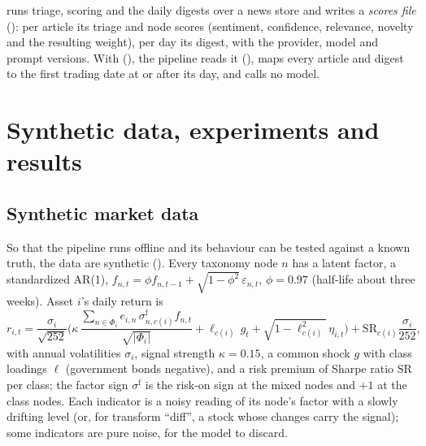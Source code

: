  runs triage, scoring and the daily digests over a news store and writes a
\emph{scores file} (): per article its triage and node scores (sentiment, confidence,
relevance, novelty and the resulting weight), per day its digest, with the provider, model and prompt versions. With
 (), the pipeline reads it (), maps every article and
digest to the first trading date at or after its day, and calls no model.

\chapter{Synthetic data, experiments and results}\label{ch:rb-synthetic}

\section{Synthetic market data}
So that the pipeline runs offline and its behaviour can be tested against a known truth, the data are synthetic
(). Every taxonomy node $n$ has a latent factor, a standardized AR(1),
$f_{n,t}=\phi f_{n,t-1}+\sqrt{1-\phi^2}\,\varepsilon_{n,t}$, $\phi=0.97$ (half-life about three weeks). Asset $i$'s
daily return is
\[
  r_{i,t}=\frac{\sigma_i}{\sqrt{252}}\Big(\kappa\,\frac{\sum_{n\in\Phi_i}e_{i,n}\,\sigma^{\mathrm{f}}_{n,c(i)}f_{n,t}}{\sqrt{|\Phi_i|}}
  +\ell_{c(i)}\,g_t+\sqrt{1-\ell_{c(i)}^2}\,\eta_{i,t}\Big)+\mathrm{SR}_{c(i)}\frac{\sigma_i}{252},
\]
with annual volatilities $\sigma_i$, signal strength $\kappa=0.15$, a common shock $g$ with class loadings $\ell$
(government bonds negative), and a risk premium of Sharpe ratio $\mathrm{SR}$ per class; the factor sign
$\sigma^{\mathrm f}$ is the risk-on sign at the mixed nodes and $+1$ at the class nodes. Each indicator is a noisy reading of
its node's factor with a slowly drifting level (or, for transform ``diff'', a stock whose changes carry the signal);
some indicators are pure noise, for the model to discard.

